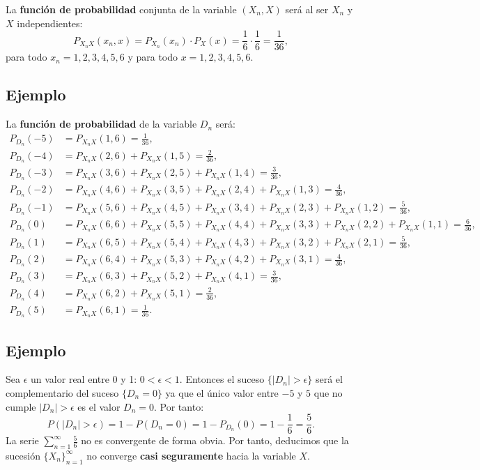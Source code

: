 \documentclass[]{book}
\begin{document}
La \textbf{función de probabilidad} conjunta de la variable \((X_n,X)\) será al ser \(X_n\) y \(X\) independientes:
\[
P_{X_nX}(x_n,x)=P_{X_n}(x_n)\cdot P_X(x)=\frac{1}{6}\cdot \frac{1}{6}=\frac{1}{36},
\]
para todo \(x_n=1,2,3,4,5,6\) y para todo \(x=1,2,3,4,5,6\).

\hypertarget{ejemplo-137}{%
\subsection{Ejemplo}\label{ejemplo-137}}

La \textbf{función de probabilidad} de la variable \(D_n\) será:
\[
\begin{array}{rl}
P_{D_n}(-5) & =P_{X_nX}(1,6)=\frac{1}{36}, \\
P_{D_n}(-4) & =P_{X_nX}(2,6)+P_{X_nX}(1,5)=\frac{2}{36}, \\
P_{D_n}(-3) & =P_{X_nX}(3,6)+P_{X_nX}(2,5)+P_{X_nX}(1,4)=\frac{3}{36}, \\
P_{D_n}(-2) & =P_{X_nX}(4,6)+P_{X_nX}(3,5)+P_{X_nX}(2,4)+P_{X_nX}(1,3)=\frac{4}{36}, \\
P_{D_n}(-1) & =P_{X_nX}(5,6)+P_{X_nX}(4,5)+P_{X_nX}(3,4)+P_{X_nX}(2,3)+P_{X_nX}(1,2)=\frac{5}{36}, \\
P_{D_n}(0) & =P_{X_nX}(6,6)+P_{X_nX}(5,5)+P_{X_nX}(4,4)+P_{X_nX}(3,3)+P_{X_nX}(2,2)+P_{X_nX}(1,1)=\frac{6}{36}, \\
P_{D_n}(1) & =P_{X_nX}(6,5)+P_{X_nX}(5,4)+P_{X_nX}(4,3)+P_{X_nX}(3,2)+P_{X_nX}(2,1)=\frac{5}{36}, \\
P_{D_n}(2) & =P_{X_nX}(6,4)+P_{X_nX}(5,3)+P_{X_nX}(4,2)+P_{X_nX}(3,1)=\frac{4}{36}, \\
P_{D_n}(3) & =P_{X_nX}(6,3)+P_{X_nX}(5,2)+P_{X_nX}(4,1)=\frac{3}{36}, \\
P_{D_n}(4) & =P_{X_nX}(6,2)+P_{X_nX}(5,1)=\frac{2}{36}, \\
P_{D_n}(5) & =P_{X_nX}(6,1)=\frac{1}{36}.
\end{array}
\]

\hypertarget{ejemplo-138}{%
\subsection{Ejemplo}\label{ejemplo-138}}

Sea \(\epsilon\) un valor real entre 0 y 1: \(0<\epsilon <1\). Entonces el suceso \(\{|D_n|>\epsilon\}\) será el complementario del suceso \(\{D_n=0\}\) ya que el único valor entre \(-5\) y \(5\) que no cumple \(|D_n|>\epsilon\) es el valor \(D_n=0\). Por tanto:
\[
P(|D_n|>\epsilon)=1-P(D_n=0)=1-P_{D_n}(0)=1-\frac{1}{6}=\frac{5}{6}.
\]
La serie \(\sum\limits_{n=1}^\infty \frac{5}{6}\) no es convergente de forma obvia. Por tanto, deducimos que la sucesión \(\{X_n\}_{n=1}^\infty\) no converge \textbf{casi seguramente} hacia la variable \(X\).
\end{document}
